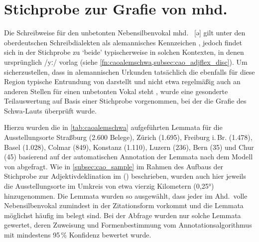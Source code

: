 
\chapter{Stichprobe zur Grafie von mhd.\ }
\label{sec:caoalemschwa}

Die Schreibweise  für den unbetonten Nebensilbenvokal mhd.~ [ə]
gilt unter den ober\-deutschen Schreibdialekten als alemannisches Kennzeichen
\autocites[vgl.][25]{weinhold1863}[75]{weinhold1883}[41, 113]{paul2007}, jedoch
findet sich  in der Stichprobe zu  `beide' typischerweise
in solchen Kontexten, in denen ursprünglich  /yː/ vorlag (siehe
\cref{fn:caoalemschwa,subsec:cao_adjflex_disc}). Um sicherzustellen, dass
 in alemannischen Urkunden tatsächlich die ebenfalls für diese Region
typische Entrundung von  darstellt und nicht etwa regelmäßig auch an
anderen Stellen für einen unbetonten Vokal steht
\autocites%
	[466--467]{schirmunski1962}%
	[41]{paul2007}%
	[305]{ksw2}%
	[vgl.~auch][131--132]{boesch1946}%
, wurde eine gesonderte Teilauswertung auf Basis einer Stichprobe vorgenommen,
bei der die Grafie des Schwa-Lauts überprüft wurde.

Hierzu wurden die in \cref{tab:caoalemschwa} aufgeführten Lemmata für die
Ausstellungsorte
Straßburg (2.600 Belege),
% 
Zürich (1.695),
% 
Freiburg i.\,Br. (1.478),
% 
Basel (1.028),
% 
Colmar (849),
% 
Konstanz (1.110),
% 
Luzern (236),
% 
Bern (35)
% 
und Chur (45)
% 
basierend auf der automatischen Annotation der Lemmata nach dem Modell von
\citet{schmid2019} abgefragt. Wie in \cref{subsec:cao_sample} im Rahmen des
Aufbaus der Stichprobe zur Adjektivdeklination im  (\CAO) beschrieben, wurden auch hier jeweils die
Ausstellungsorte im Umkreis von etwa vierzig Kilometern (0,25°) hinzugenommen.
Die Lemmata wurden so ausgewählt, dass jeder im Ahd.\ volle Nebensilbenvokal
zumindest in der Zitationsform vorkommt und die Lemmata möglichst häufig im
\CAO{} belegt sind. Bei der Abfrage wurden nur solche Lemmata gewertet, deren
Zuweisung und Formenbestimmung vom Annotations\-algorithmus mit mindestens
95\,\% Konfidenz bewertet wurde.

